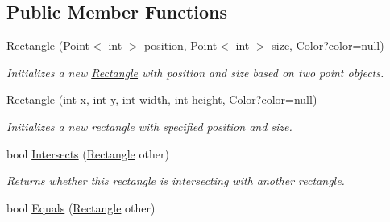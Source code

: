 \subsection*{Public Member Functions}
\begin{DoxyCompactItemize}
\item 
\hyperlink{struct_tri_devs_1_1_tri_engine2_d_1_1_rectangle_a1477d4ed6b9859e910afa3e3ee464de2}{Rectangle} (Point$<$ int $>$ position, Point$<$ int $>$ size, \hyperlink{struct_tri_devs_1_1_tri_engine2_d_1_1_color}{Color}?color=null)
\begin{DoxyCompactList}\small\item\em Initializes a new \hyperlink{struct_tri_devs_1_1_tri_engine2_d_1_1_rectangle}{Rectangle} with position and size based on two point objects. \end{DoxyCompactList}\item 
\hyperlink{struct_tri_devs_1_1_tri_engine2_d_1_1_rectangle_a9bb491954d323ce92b1114727cfe5f3f}{Rectangle} (int x, int y, int width, int height, \hyperlink{struct_tri_devs_1_1_tri_engine2_d_1_1_color}{Color}?color=null)
\begin{DoxyCompactList}\small\item\em Initializes a new rectangle with specified position and size. \end{DoxyCompactList}\item 
bool \hyperlink{struct_tri_devs_1_1_tri_engine2_d_1_1_rectangle_aee140ba5e137cd1c8be46240c2c97ed1}{Intersects} (\hyperlink{struct_tri_devs_1_1_tri_engine2_d_1_1_rectangle}{Rectangle} other)
\begin{DoxyCompactList}\small\item\em Returns whether this rectangle is intersecting with another rectangle. \end{DoxyCompactList}\item 
bool \hyperlink{struct_tri_devs_1_1_tri_engine2_d_1_1_rectangle_afb237cacc2c17325f4194a28be7d0292}{Equals} (\hyperlink{struct_tri_devs_1_1_tri_engine2_d_1_1_rectangle}{Rectangle} other)
\end{DoxyCompactItemize}
